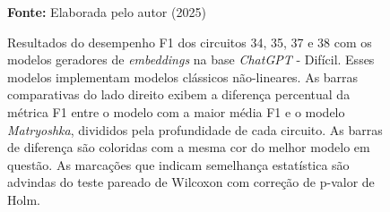 \begin{figure}
\caption{Resultados do desempenho F1 dos circuitos 34, 35, 37 e 38 com os modelos geradores de \textit{embeddings} na base \textit{ChatGPT} - Difícil. Esses modelos implementam modelos clássicos não-lineares. As barras comparativas do lado direito exibem a diferença percentual da métrica F1 entre o modelo com a maior média F1 e o modelo \textit{Matryoshka}, divididos pela profundidade de cada circuito. As barras de diferença são coloridas com a mesma cor do melhor modelo em questão. As marcações que indicam semelhança estatística são advindas do teste pareado de Wilcoxon com correção de p-valor de Holm.}
\label{fig:model_transformer:hard:g5}
     \centering
    \centering

      \par\medskip\ABNTEXfontereduzida\selectfont\textbf{Fonte:} Elaborada pelo autor (2025) \par\medskip
\end{figure}